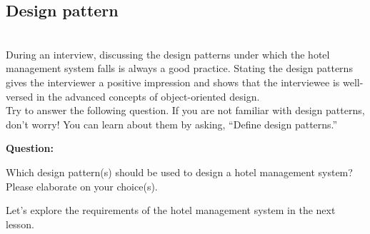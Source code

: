 \subsection{Design pattern~}\label{4_xq2OH6NiUOQ-a1zIc3V}
\\
During an interview, discussing the design patterns under which the hotel management system falls is always a good practice. Stating the design patterns gives the interviewer a positive impression and shows that the interviewee is well-versed in the advanced concepts of object-oriented design.
\\
Try to answer the following question. If you are not familiar with design patterns, don't worry! You can learn about them by asking, ``Define design patterns.''

\textbf{Question:}

Which design pattern(s) should be used to design a hotel management system? Please elaborate on your choice(s).

Let's explore the requirements of the hotel management system in the next lesson.

